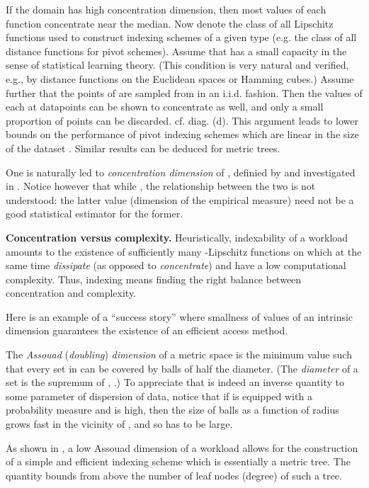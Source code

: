 \documentclass[12pt]{article}
\begin{document}
If the domain  has high concentration dimension, then most values of each function  concentrate near the median. Now denote   the class of all Lipschitz functions used to construct indexing schemes of a given type (e.g. the class of all distance functions for pivot schemes). Assume that  has a small capacity in the sense of statistical learning theory. (This condition is very natural and verified, e.g., by distance functions on the Euclidean spaces or Hamming cubes.)
Assume further that the points of  are sampled from  in an i.i.d. fashion. Then the values of each  at datapoints can be shown to concentrate as well, and only a small proportion of points can be discarded. cf. diag. (d). This argument leads to lower bounds on the performance of pivot indexing schemes which are linear in the size of the dataset \cite{VolPest09}. Similar results can be deduced for metric trees. 

One is naturally led to {\em concentration dimension} of , definied by  and investigated in \cite{pestov0708}. Notice however that while , the relationship between the two is not understood: the latter value (dimension of the empirical measure) need not be a good statistical estimator for the former.

\smallskip
\noindent
{\bf Concentration versus complexity.}
Heuristically, indexability of a workload  amounts to the existence of sufficiently many -Lipschitz functions  on  which at the same time {\em dissipate} (as opposed to {\em concentrate}) and have a low computational complexity. Thus, indexing means finding the right balance between concentration and complexity.

Here is an example of a ``success story'' where smallness of values of an intrinsic dimension guarantees the existence of an efficient access method. 

\smallskip
{}
The {\em Assouad} ({\em doubling}) {\em dimension} of a metric space  is the minimum value  such that every set  in  can be covered by  balls of half the diameter. (The {\em diameter}  of a set  is the supremum of , .) To appreciate that  is indeed an inverse quantity to some parameter of dispersion of data, notice that if  is equipped with a probability measure and  is high, then the size of balls as a function of radius grows fast in the vicinity of , and so  has to be large.

As shown in \cite{KL}, a low Assouad dimension of a workload allows for the construction of a simple and efficient indexing scheme which is essentially a metric tree. The quantity  bounds from above the number of leaf nodes (degree) of such a tree.
\end{document}

